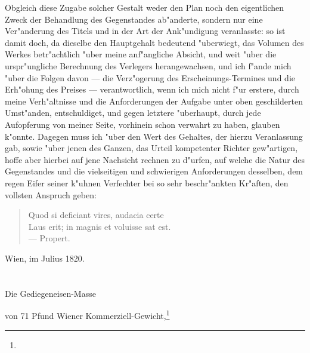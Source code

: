 \documentclass[a4paper, 11pt, oneside, german]{article}
\begin{document}
Obgleich diese Zugabe solcher Gestalt weder den Plan noch den eigentlichen Zweck der Behandlung des Gegenstandes ab"anderte, sondern nur eine Ver"anderung des Titels und in der Art der Ank"undigung veranlasste: so ist damit doch, da dieselbe den Hauptgehalt bedeutend "uberwiegt, das Volumen des Werkes betr"achtlich "uber meine anf"angliche Absicht, und weit "uber die urspr"ungliche Berechnung des Verlegers herangewachsen, und ich f"ande mich "uber die Folgen davon --- die Verz"ogerung des Erscheinungs-Termines und die Erh"ohung des Preises --- verantwortlich, wenn ich mich nicht f"ur erstere, durch meine Verh"altnisse und die Anforderungen der Aufgabe unter oben geschilderten Umst"anden, entschuldiget, und gegen letztere "uberhaupt, durch jede Aufopferung von meiner Seite, vorhinein schon verwahrt zu haben, glauben k"onnte. Dagegen muss ich "uber den Wert des Gehaltes, der hierzu Veranlassung gab, sowie "uber jenen des Ganzen, das Urteil kompetenter Richter gew"artigen, hoffe aber hierbei auf jene Nachsicht rechnen zu d"urfen, auf welche die Natur des Gegenstandes und die vielseitigen und schwierigen Anforderungen desselben, dem regen Eifer seiner k"uhnen Verfechter bei so sehr beschr"ankten Kr"aften, den vollsten Anspruch geben:

\begin{quote}
Quod si deficiant vires, audacia certe\\
Laus erit; in magnis et voluisse sat est.\\
--- Propert.
\end{quote}

Wien, im Julius 1820.
\clearpage
\section{}
\begin{center}
Die Gediegeneisen-Masse

von 71 Pfund Wiener Kommerziell-Gewicht,\footnote{}
\end{center}
\end{document}
